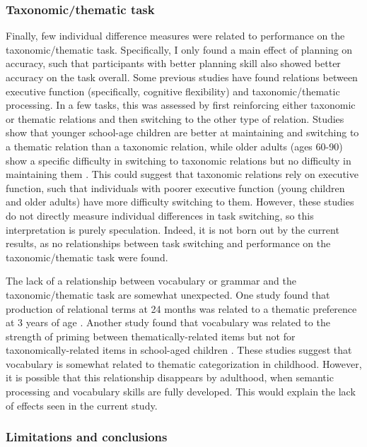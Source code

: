 \documentclass[../dissertation.tex]{subfiles}
\begin{document}
\subsubsection{Taxonomic/thematic task}
	Finally, few individual difference measures were related to performance on the taxonomic/thematic task. Specifically, I only found a main effect of planning on accuracy, such that participants with better planning skill also showed better accuracy on the task overall. Some previous studies have found relations between executive function (specifically, cognitive flexibility) and taxonomic/thematic processing. In a few tasks, this was assessed by first reinforcing either taxonomic or thematic relations and then switching to the other type of relation. Studies show that younger school-age children are better at maintaining and switching to a thematic relation than a taxonomic relation, while older adults (ages 60-90) show a specific difficulty in switching to taxonomic relations but no difficulty in maintaining them \citep{Blaye2007, Maintenant2011}. This could suggest that taxonomic relations rely on executive function, such that individuals with poorer executive function (young children and older adults) have more difficulty switching to them. However, these studies do not directly measure individual differences in task switching, so this interpretation is purely speculation. Indeed, it is not born out by the current results, as no relationships between task switching and performance on the taxonomic/thematic task were found. \par 
	The lack of a relationship between vocabulary or grammar and the taxonomic/thematic task are somewhat unexpected. One study found that production of relational terms at 24 months was related to a thematic preference at 3 years of age \citep{Dunham1995}. Another study found that vocabulary was related to the strength of priming between thematically-related items but not for taxonomically-related items in school-aged children \citep{Brooks2014}. These studies suggest that vocabulary is somewhat related to thematic categorization in childhood. However, it is possible that this relationship disappears by adulthood, when semantic processing and vocabulary skills are fully developed. This would explain the lack of effects seen in the current study. \par
	
\subsubsection{Limitations and conclusions}	
\end{document}
